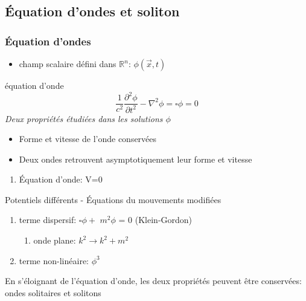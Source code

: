 \documentclass[handout]{beamer}
\begin{document}
\subsection{Équation d'ondes et soliton}
\begin{frame}
\frametitle{Équation d'ondes}
\begin{itemize}
\item  champ scalaire défini dans $\mathbb{R}^n$: $\phi(\vec{x},t)$\\
\end{itemize}
\begin{block}{équation d'onde}
\begin{equation}
\frac{1}{c^2}\frac{\partial^2 \phi}{\partial t^2} - \nabla^2 \phi = \square \phi = 0 
\end{equation}
\textit{Deux propriétés étudiées dans les solutions $\phi$}
\begin{itemize}
\item Forme et vitesse de l'onde conservées\\
\item Deux ondes retrouvent asymptotiquement leur forme et vitesse\\
\end{itemize}
\end{block} 
\end{frame}

\begin{frame}
\begin{enumerate}
\item Équation d'onde: V=0
\end{enumerate}

\begin{block}{Potentiels différents - Équations du mouvements modifiées}
\begin{enumerate}

\item terme dispersif: $\square\phi +$ \boldmath $m^2 \phi $ \unboldmath  = 0 (Klein-Gordon)\\
\begin{enumerate}
\item onde plane: $k^2 \rightarrow k^2+m^2$

\end{enumerate}
\item terme non-linéaire: $\phi^3$ \\
\end{enumerate}
\end{block}
En s'éloignant de l'équation d'onde, les deux propriétés peuvent être conservées: ondes solitaires et solitons 

\end{frame}
\end{document}
